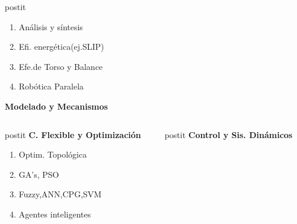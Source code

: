 {\begin{frame}
\begin{center}
{\begin{columns}[c]
          \begin{column}{3cm}
            \begin{beamercolorbox}[sep=0.5em,wd=3cm,rounded=true,center,shadow=true]{postit}
              \begin{enumerate}\tiny
              \item An\'alisis y s\'intesis
              \item Efi. energ\'etica(ej.SLIP)
              \item Efe.de Torso y Balance
              \item Rob\'otica Paralela
              \end{enumerate}
              \textbf{Modelado y Mecanismos}
            \end{beamercolorbox}
          \end{column}
        \end{columns}
        \vspace{1.0cm}
        \begin{columns}[c]
          \begin{column}{3cm}
            \begin{beamercolorbox}[sep=0.5em,wd=3cm,rounded=true,center,shadow=true]{postit}
              \textbf{C. Flexible y Optimizaci\'on}
              \begin{enumerate}\tiny
              \item Optim. Topol\'ogica
              \item GA's, PSO
              \item Fuzzy,ANN,CPG,SVM
              \item Agentes inteligentes
              \end{enumerate}
            \end{beamercolorbox}
          \end{column}
          \begin{column}{3cm}
            \begin{beamercolorbox}[sep=0.5em,wd=3cm,rounded=true,center,shadow=true]{postit}
              \textbf{Control y Sis. Din\'amicos}
              \begin{enumerate}\tiny

\end{enumerate}
\end{beamercolorbox}
\end{column}
\end{columns}}
\end{center}
\end{frame}}
